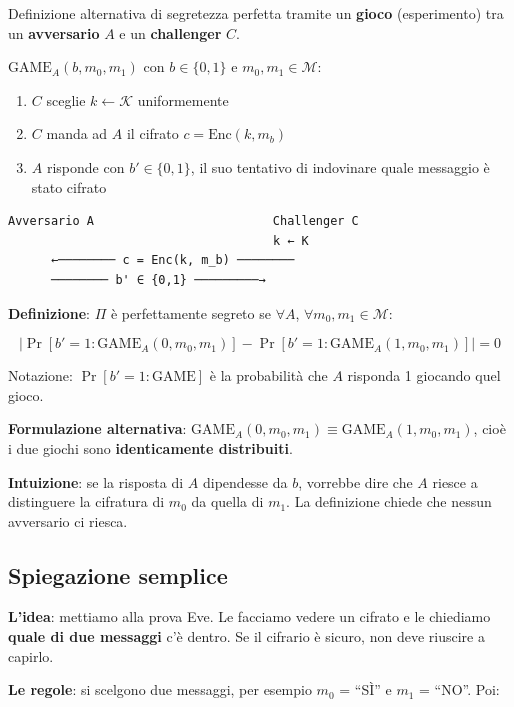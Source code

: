 Definizione alternativa di segretezza perfetta tramite un \textbf{gioco} (esperimento) tra un \textbf{avversario} \(A\) e un \textbf{challenger} \(C\).

\(\text{GAME}_A(b, m_0, m_1)\) con \(b \in \{0,1\}\) e \(m_0, m_1 \in \mathcal{M}\):

\begin{enumerate}
\def\labelenumi{\arabic{enumi}.}
\tightlist
\item
  \(C\) sceglie \(k \leftarrow \mathcal{K}\) uniformemente
\item
  \(C\) manda ad \(A\) il cifrato \(c = \text{Enc}(k, m_b)\)
\item
  \(A\) risponde con \(b' \in \{0,1\}\), il suo tentativo di indovinare quale messaggio è stato cifrato
\end{enumerate}

\begin{verbatim}
Avversario A                         Challenger C
                                     k ← K
      ←──────── c = Enc(k, m_b) ────────
      ──────── b' ∈ {0,1} ─────────→
\end{verbatim}

\textbf{Definizione}: \(\Pi\) è perfettamente segreto se \(\forall A\), \(\forall m_0, m_1 \in \mathcal{M}\):

\[
\Big| \Pr[b' = 1 : \text{GAME}_A(0, m_0, m_1)] - \Pr[b' = 1 : \text{GAME}_A(1, m_0, m_1)] \Big| = 0
\]

Notazione: \(\Pr[b' = 1 : \text{GAME}]\) è la probabilità che \(A\) risponda 1 giocando quel gioco.

\textbf{Formulazione alternativa}: \(\text{GAME}_A(0, m_0, m_1) \equiv \text{GAME}_A(1, m_0, m_1)\), cioè i due giochi sono \textbf{identicamente distribuiti}.

\textbf{Intuizione}: se la risposta di \(A\) dipendesse da \(b\), vorrebbe dire che \(A\) riesce a distinguere la cifratura di \(m_0\) da quella di \(m_1\). La definizione chiede che nessun avversario ci riesca.

\subsection{Spiegazione semplice}

\textbf{L'idea}: mettiamo alla prova Eve. Le facciamo vedere un cifrato e le chiediamo \textbf{quale di due messaggi} c'è dentro. Se il cifrario è sicuro, non deve riuscire a capirlo.

\textbf{Le regole}: si scelgono due messaggi, per esempio \(m_0\) = ``SÌ'' e \(m_1\) = ``NO''. Poi:

